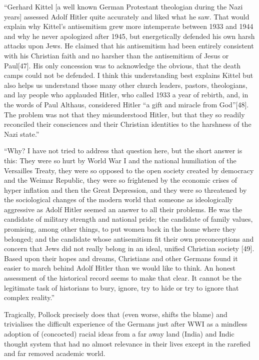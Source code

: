 \begin{myquote}
“Gerhard Kittel [a well known German Protestant theologian during the Nazi years] assessed Adolf Hitler quite accurately and liked what he saw. That would explain why Kittel’s antisemitism grew more intemperate between 1933 and 1944 and why he never apologized after 1945, but energetically defended his own harsh attacks upon Jews. He claimed that his antisemitism had been entirely consistent with his Christian faith and no harsher than the antisemitism of Jesus or Paul[47]. His only concession was to acknowledge the obvious, that the death camps could not be defended. I think this understanding best explains Kittel but also helps us understand those many other church leaders, pastors, theologians, and lay people who applauded Hitler, who called 1933 a year of rebirth, and, in the words of Paul Althaus, considered Hitler “a gift and miracle from God”[48]. The problem was not that they misunderstood Hitler, but that they so readily reconciled their consciences and their Christian identities to the harshness of the Nazi state.”

“Why? I have not tried to address that question here, but the short answer is this: They were so hurt by World War I and the national humiliation of the Versailles Treaty, they were so opposed to the open society created by democracy and the Weimar Republic, they were so frightened by the economic crises of hyper inflation and then the Great Depression, and they were so threatened by the sociological changes of the modern world that someone as ideologically aggressive as Adolf Hitler seemed an answer to all their problems. He was the candidate of military strength and national pride; the candidate of family values, promising, among other things, to put women back in the home where they belonged; and the candidate whose antisemitism fit their own preconceptions and concern that Jews did not really belong in an ideal, unified Christian society [49]. Based upon their hopes and dreams, Christians and other Germans found it easier to march behind Adolf Hitler than we would like to think. An honest assessment of the historical record seems to make that clear. It cannot be the legitimate task of historians to bury, ignore, try to hide or try to ignore that complex reality.”
\end{myquote}
\newpage

Tragically, Pollock precisely does that (even worse, shifts the blame) and trivialises the difficult experience of the Germans just after WWI as a mindless adoption of (concocted) racial ideas from a far away land (India) and Indic thought system that had no almost relevance in their lives except in the rarefied and far removed academic world.

